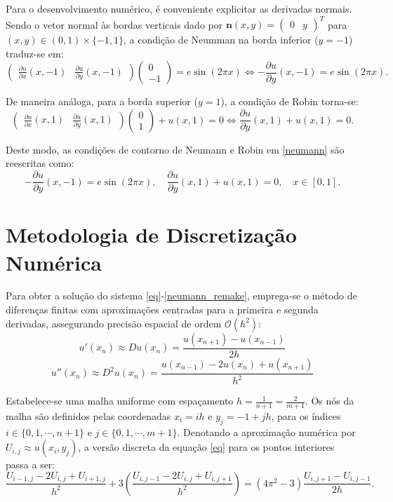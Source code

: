 \documentclass[12pt, a4paper]{article}
\begin{document}
    Para o desenvolvimento numérico, é conveniente explicitar as derivadas normais. Sendo o vetor normal às bordas verticais dado por $\mathbf{n}(x,y) = \begin{pmatrix}0 & y\end{pmatrix}^T$ para $(x,y)\! \in\! (0,1) \times \{-1,1\}$, a condição de Neumman na borda inferior ($y = -1$) traduz-se em:
    \[\begin{pmatrix}\frac{\partial u}{\partial x}(x,-1) & \frac{\partial u}{\partial y}(x,-1)\end{pmatrix} \begin{pmatrix}0 \\ -1\end{pmatrix} = e \sin(2\pi x) \iff -\frac{\partial u}{\partial y}(x,-1) = e \sin(2\pi x).\]

    De maneira análoga, para a borda superior ($y = 1$), a condição de Robin torna-se:
    \[\begin{pmatrix}\frac{\partial u}{\partial x}(x,1) & \frac{\partial u}{\partial y}(x,1)\end{pmatrix} \begin{pmatrix}0 \\ 1\end{pmatrix} + u(x,1) = 0 \iff \frac{\partial u}{\partial y}(x,1) + u(x,1) = 0.\]

    Deste modo, as condições de contorno de Neumann e Robin em \eqref{neumann} são reescritas como:
    \begin{equation}
        -\frac{\partial u}{\partial y}(x,-1) = e \sin(2\pi x),\quad \frac{\partial u}{\partial y}(x,1) + u(x,1) = 0, \quad x \in [0,1]. \label{neumann_remake}
    \end{equation}


    \section{Metodologia de Discretização Numérica}

    Para obter a solução do sistema \eqref{eq}-\eqref{neumann_remake}, emprega-se o método de diferenças finitas com aproximações centradas para a primeira e segunda derivadas, assegurando precisão espacial de ordem $\mathcal{O}(h^2)$:
    \[u'(x_n) \approx Du(x_n) = \frac{u(x_{n+1})-u(x_{n-1})}{2h}\]
    \[u''(x_n) \approx D^2u(x_n) = \frac{u(x_{n-1})-2u(x_n)+u(x_{n+1})}{h^2}\]

    Estabelece-se uma malha uniforme com espaçamento $h = \frac{1}{n+1} = \frac{2}{m+1}$. Os nós da malha são definidos pelas coordenadas $x_i = ih$ e $y_j = -1 + jh$, para os índices $i \in \{0,1,\cdots,n+1\}$ e $j \in \{0,1,\cdots,m+1\}$. Denotando a aproximação numérica por $U_{i,j} \approx u(x_i, y_j)$, a versão discreta da equação \eqref{eq} para os pontos interiores passa a ser:
    \begin{equation}
        \frac{U_{i-1,j}-2U_{i,j}+U_{i+1,j}}{h^2} + 3\left(\frac{U_{i,j-1}-2U_{i,j}+U_{i,j+1}}{h^2}\right) = (4\pi^2-3)\frac{U_{i,j+1}-U_{i,j-1}}{2h}. \label{num_eq}
    \end{equation}
\end{document}
